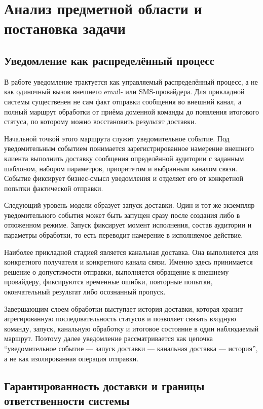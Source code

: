 \section{Анализ предметной области и постановка задачи}

\subsection{Уведомление как распределённый процесс}

В работе уведомление трактуется как управляемый распределённый процесс, а не как одиночный вызов внешнего email- или SMS-провайдера. Для прикладной системы существенен не сам факт отправки сообщения во внешний канал, а полный маршрут обработки от приёма доменной команды до появления итогового статуса, по которому можно восстановить результат доставки.

Начальной точкой этого маршрута служит уведомительное событие. Под уведомительным событием понимается зарегистрированное намерение внешнего клиента выполнить доставку сообщения определённой аудитории с заданным шаблоном, набором параметров, приоритетом и выбранным каналом связи. Событие фиксирует бизнес-смысл уведомления и отделяет его от конкретной попытки фактической отправки.

Следующий уровень модели образует запуск доставки. Один и тот же экземпляр уведомительного события может быть запущен сразу после создания либо в отложенном режиме. Запуск фиксирует момент исполнения, состав аудитории и параметры обработки, то есть переводит намерение в исполняемое действие.

Наиболее прикладной стадией является канальная доставка. Она выполняется для конкретного получателя и конкретного канала связи. Именно здесь принимается решение о допустимости отправки, выполняется обращение к внешнему провайдеру, фиксируются временные ошибки, повторные попытки, окончательный результат либо осознанный пропуск.

Завершающим слоем обработки выступает история доставки, которая хранит агрегированную последовательность статусов и позволяет связать входную команду, запуск, канальную обработку и итоговое состояние в один наблюдаемый маршрут. Поэтому далее уведомление рассматривается как цепочка ``уведомительное событие --- запуск доставки --- канальная доставка --- история'', а не как изолированная операция отправки.

\subsection{Гарантированность доставки и границы ответственности системы}

